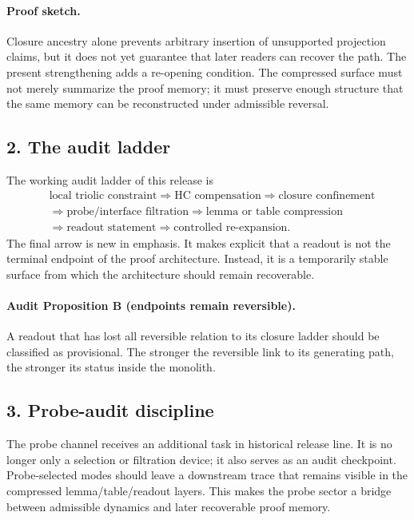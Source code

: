 \documentclass[12pt,a4paper]{article}
\DeclareRobustCommand{\QSCver}[1]{archival stage}
\renewcommand{\QSCver}[1]{historical release line}
\begin{document}
\paragraph{Proof sketch.}
Closure ancestry alone prevents arbitrary insertion of unsupported projection
claims, but it does not yet guarantee that later readers can recover the path.
The present strengthening adds a re-opening condition. The compressed surface
must not merely summarize the proof memory; it must preserve enough structure
that the same memory can be reconstructed under admissible reversal.

\subsection*{2. The audit ladder}
The working audit ladder of this release is
\[
\begin{aligned}
&\text{local triolic constraint} \Longrightarrow \text{HC compensation} \Longrightarrow \text{closure confinement}\\
&\Longrightarrow \text{probe/interface filtration} \Longrightarrow \text{lemma or table compression}\\
&\Longrightarrow \text{readout statement} \Longrightarrow \text{controlled re-expansion}.
\end{aligned}
\]
The final arrow is new in emphasis. It makes explicit that a readout is not the
terminal endpoint of the proof architecture. Instead, it is a temporarily stable
surface from which the architecture should remain recoverable.

\paragraph{Audit Proposition B (endpoints remain reversible).}
A readout that has lost all reversible relation to its closure ladder should be
classified as provisional. The stronger the reversible link to its generating
path, the stronger its status inside the monolith.

\subsection*{3. Probe-audit discipline}
The probe channel receives an additional task in \QSCver{v2.1.0}. It is no longer
only a selection or filtration device; it also serves as an audit checkpoint.
Probe-selected modes should leave a downstream trace that remains visible in the
compressed lemma/table/readout layers. This makes the probe sector a bridge
between admissible dynamics and later recoverable proof memory.
\end{document}
